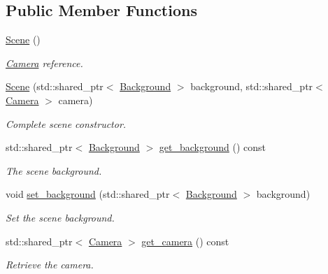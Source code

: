 \subsection*{Public Member Functions}
\begin{DoxyCompactItemize}
\item 
\mbox{\hyperlink{classrayt_1_1_scene_a97534e52f4f218ad80d23babcbc758ad}{Scene}} ()
\begin{DoxyCompactList}\small\item\em \mbox{\hyperlink{class_camera}{Camera}} reference. \end{DoxyCompactList}\item 
\mbox{\label{classrayt_1_1_scene_a539d8be48d2a6e2516dbae4bf0ebc7da}} 
\mbox{\hyperlink{classrayt_1_1_scene_a539d8be48d2a6e2516dbae4bf0ebc7da}{Scene}} (std\+::shared\+\_\+ptr$<$ \mbox{\hyperlink{classrayt_1_1_background}{Background}} $>$ background, std\+::shared\+\_\+ptr$<$ \mbox{\hyperlink{class_camera}{Camera}} $>$ camera)
\begin{DoxyCompactList}\small\item\em Complete scene constructor. \end{DoxyCompactList}\item 
std\+::shared\+\_\+ptr$<$ \mbox{\hyperlink{classrayt_1_1_background}{Background}} $>$ \mbox{\hyperlink{classrayt_1_1_scene_add7bcaeaf2268a63634613d70cc7c345}{get\+\_\+background}} () const
\begin{DoxyCompactList}\small\item\em The scene background. \end{DoxyCompactList}\item 
void \mbox{\hyperlink{classrayt_1_1_scene_a13012312e90ffd74e9b5ef34d7a19f17}{set\+\_\+background}} (std\+::shared\+\_\+ptr$<$ \mbox{\hyperlink{classrayt_1_1_background}{Background}} $>$ background)
\begin{DoxyCompactList}\small\item\em Set the scene background. \end{DoxyCompactList}\item 
std\+::shared\+\_\+ptr$<$ \mbox{\hyperlink{class_camera}{Camera}} $>$ \mbox{\hyperlink{classrayt_1_1_scene_aae90d3f219fb89a471f84b1653310b33}{get\+\_\+camera}} () const
\begin{DoxyCompactList}\small\item\em Retrieve the camera. \end{DoxyCompactList}\item 

\end{DoxyCompactItemize}
